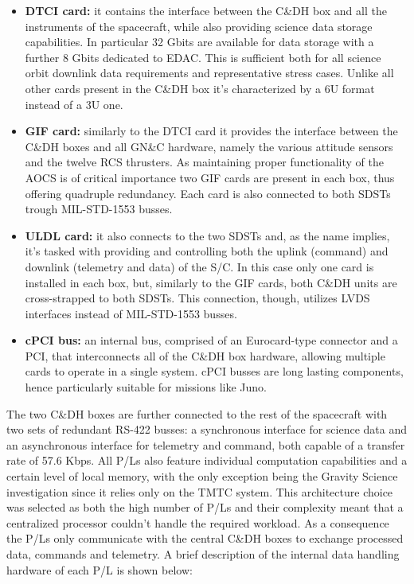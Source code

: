 \begin{itemize}
    \item \textbf{DTCI card:} it contains the interface between the C\&DH box and all the instruments of the spacecraft, while also providing science data storage capabilities. In particular 32 Gbits are available for data storage with a further 8 Gbits dedicated to EDAC. This is sufficient both for all science orbit downlink data requirements and representative stress cases. Unlike all other cards present in the C\&DH box it's characterized by a 6U format instead of a 3U one. \cite{juno_sito}
    \item \textbf{GIF card:} similarly to the DTCI card it provides the interface between the C\&DH boxes and all GN\&C hardware, namely the various attitude sensors and the twelve RCS thrusters. As maintaining proper functionality of the AOCS is of critical importance two GIF cards are present in each box, thus offering quadruple redundancy. Each card is also connected to both SDSTs trough MIL-STD-1553 \cite{MIL-STD-1553} busses. \cite{juno_telecommunication}   
    \item \textbf{ULDL card:} it also connects to the two SDSTs and, as the name implies, it's tasked with providing and controlling both the uplink (command) and downlink (telemetry and data) of the S/C. In this case only one card is installed in each box, but, similarly to the GIF cards, both C\&DH units are cross-strapped to both SDSTs. This connection, though, utilizes LVDS interfaces instead of MIL-STD-1553 busses. \cite{juno_telecommunication}  
    \item \textbf{cPCI bus:} an internal bus, comprised of an Eurocard-type connector and a PCI, that interconnects all of the C\&DH box hardware, allowing multiple cards to operate in a single system. cPCI busses are long lasting components, hence particularly suitable for missions like Juno.
    

\end{itemize}
The two C\&DH boxes are further connected to the rest of the spacecraft with two sets of redundant RS-422 busses: a synchronous interface for science data  and an asynchronous interface for telemetry and command, both capable of a transfer rate of 57.6 Kbps. \cite{UVS_info} \cite{MWR_info} 
All P/Ls also feature individual computation capabilities and a certain level of local memory, with the only exception being the Gravity Science investigation since it relies only on the TMTC system. This architecture choice was selected as both the high number of P/Ls and their complexity meant that a centralized processor couldn't handle the required workload. As a consequence the P/Ls only communicate with the central C\&DH boxes to exchange processed data, commands and telemetry. A brief description of the internal data handling hardware of each P/L is shown below:
